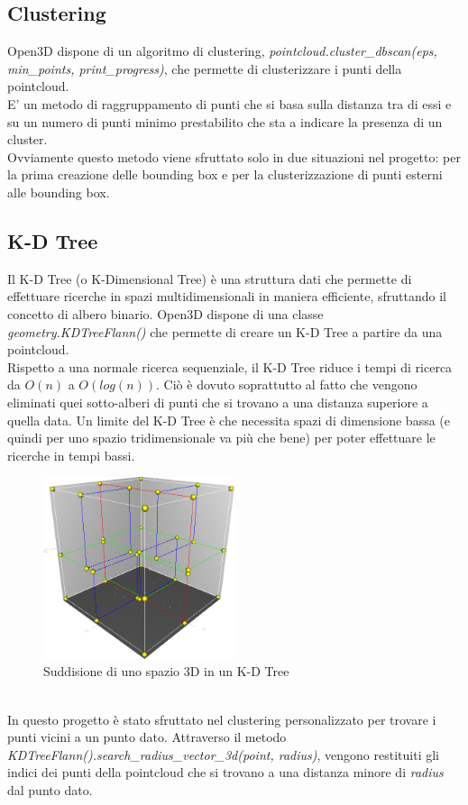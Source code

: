 \documentclass[italian]{report}
\begin{document}
\subsection{Clustering}
Open3D dispone di un algoritmo di clustering, \textit{pointcloud.cluster\_dbscan(eps, min\_points, print\_progress)}, che permette di clusterizzare i punti della pointcloud.\\
E' un metodo di raggruppamento di punti che si basa sulla distanza tra di essi e su un numero di punti minimo prestabilito che sta a indicare la presenza di un cluster.\\
Ovviamente questo metodo viene sfruttato solo in due situazioni nel progetto: per la prima creazione delle bounding box e per la clusterizzazione di punti esterni alle bounding box.
\subsection{K-D Tree}
Il K-D Tree (o K-Dimensional Tree) è una struttura dati che permette di effettuare ricerche in spazi multidimensionali in maniera efficiente, sfruttando il concetto di albero binario. Open3D dispone di una classe \textit{geometry.KDTreeFlann()} che permette di creare un K-D Tree a partire da una pointcloud.\\
Rispetto a una normale ricerca sequenziale, il K-D Tree riduce i tempi di ricerca da $O(n)$ a $O(log(n))$. Ciò è dovuto soprattutto al fatto che vengono eliminati quei sotto-alberi di punti che si trovano a una distanza superiore a quella data. Un limite del K-D Tree è che necessita spazi di dimensione bassa (e quindi per uno spazio tridimensionale va più che bene) per poter effettuare le ricerche in tempi bassi.
\begin{figure}[H]
	\centering
	\includegraphics[width=0.5\textwidth]{3dtree}
	\footnotesize
	\caption{Suddisione di uno spazio 3D in un K-D Tree}
\end{figure}\\
In questo progetto è stato sfruttato nel clustering personalizzato per trovare i punti vicini a un punto dato. Attraverso il metodo \textit{KDTreeFlann().search\_radius\_vector\_3d(point, radius)}, vengono restituiti gli indici dei punti della pointcloud che si trovano a una distanza minore di \textit{radius} dal punto dato.
\end{document}
